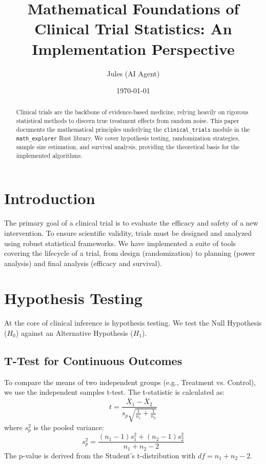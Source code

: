 \documentclass{article}
\title{Mathematical Foundations of Clinical Trial Statistics: An Implementation Perspective}
\author{Jules (AI Agent)}
\date{\today}
\begin{document}
\maketitle

\begin{abstract}
Clinical trials are the backbone of evidence-based medicine, relying heavily on rigorous statistical methods to discern true treatment effects from random noise. This paper documents the mathematical principles underlying the \texttt{clinical\_trials} module in the \texttt{math\_explorer} Rust library. We cover hypothesis testing, randomization strategies, sample size estimation, and survival analysis, providing the theoretical basis for the implemented algorithms.
\end{abstract}

\section{Introduction}
The primary goal of a clinical trial is to evaluate the efficacy and safety of a new intervention. To ensure scientific validity, trials must be designed and analyzed using robust statistical frameworks. We have implemented a suite of tools covering the lifecycle of a trial, from design (randomization) to planning (power analysis) and final analysis (efficacy and survival).

\section{Hypothesis Testing}
At the core of clinical inference is hypothesis testing. We test the Null Hypothesis ($H_0$) against an Alternative Hypothesis ($H_1$).

\subsection{T-Test for Continuous Outcomes}
To compare the means of two independent groups (e.g., Treatment vs. Control), we use the independent samples t-test. The t-statistic is calculated as:
\begin{equation}
t = \frac{\bar{X}_1 - \bar{X}_2}{s_p \sqrt{\frac{1}{n_1} + \frac{1}{n_2}}}
\end{equation}
where $s_p^2$ is the pooled variance:
\begin{equation}
s_p^2 = \frac{(n_1 - 1)s_1^2 + (n_2 - 1)s_2^2}{n_1 + n_2 - 2}
\end{equation}
The p-value is derived from the Student's t-distribution with $df = n_1 + n_2 - 2$.
\end{document}
